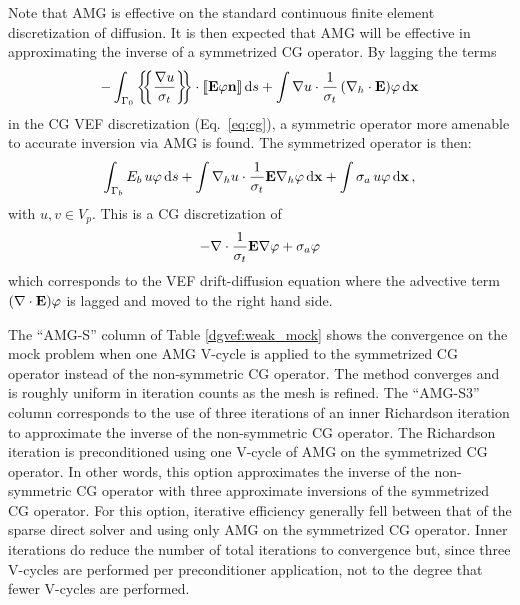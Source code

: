 \documentclass[../doc.tex]{subfiles}
\begin{document}
Note that AMG is effective on the standard continuous finite element discretization of diffusion. It is then expected that AMG will be effective in approximating the inverse of a symmetrized CG operator. By lagging the terms 
	\begin{equation}
		-\int_{\Gamma_0} \left\{\!\!\left\{\frac{\nabla u}{\sigma_t}\right\}\!\!\right\}\cdot \left\llbracket\boldsymbol{\mathrm{E}}\varphi\boldsymbol{\mathrm{n}} \right\rrbracket \mathop{}\!\mathrm{d} s + \int \nabla u \cdot \frac{1}{\sigma_t} \left( \nabla_h\cdot\boldsymbol{\mathrm{E}} \right)\!\varphi \mathop{}\!\mathrm{d} \boldsymbol{\mathrm{x}}
	\end{equation}
in the CG VEF discretization (Eq.~\ref{eq:cg}), a symmetric operator more amenable to accurate inversion via AMG is found. The symmetrized operator is then:
	\begin{equation}
		\int_{\Gamma_b} E_b\, u \varphi \mathop{}\!\mathrm{d} s + \int \nabla_h u \cdot \frac{1}{\sigma_t}\boldsymbol{\mathrm{E}} \nabla_h \varphi \mathop{}\!\mathrm{d} \boldsymbol{\mathrm{x}} + \int \sigma_a\, u \varphi \mathop{}\!\mathrm{d} \boldsymbol{\mathrm{x}} \,, 
	\end{equation}
with $u,v \in V_p$. 
This is a CG discretization of 
	\begin{equation}
		-\nabla \cdot \frac{1}{\sigma_t}\boldsymbol{\mathrm{E}}\nabla \varphi + \sigma_a \varphi 
	\end{equation} 
which corresponds to the VEF drift-diffusion equation where the advective term $\left( \nabla\cdot\boldsymbol{\mathrm{E}} \right)\!\varphi$ is lagged and moved to the right hand side. 

The ``AMG-S'' column of Table \ref{dgvef:weak_mock} shows the convergence on the mock problem when one AMG V-cycle is applied to the symmetrized CG operator instead of the non-symmetric CG operator. The method converges and is roughly uniform in iteration counts as the mesh is refined. The ``AMG-S3'' column corresponds to the use of three iterations of an inner Richardson iteration to approximate the inverse of the non-symmetric CG operator. The Richardson iteration is preconditioned using one V-cycle of AMG on the symmetrized CG operator. In other words, this option approximates the inverse of the non-symmetric CG operator with three approximate inversions of the symmetrized CG operator. For this option, iterative efficiency generally fell between that of the sparse direct solver and using only AMG on the symmetrized CG operator. Inner iterations do reduce the number of total iterations to convergence but, since three V-cycles are performed per preconditioner application, not to the degree that fewer V-cycles are performed.
\end{document}
